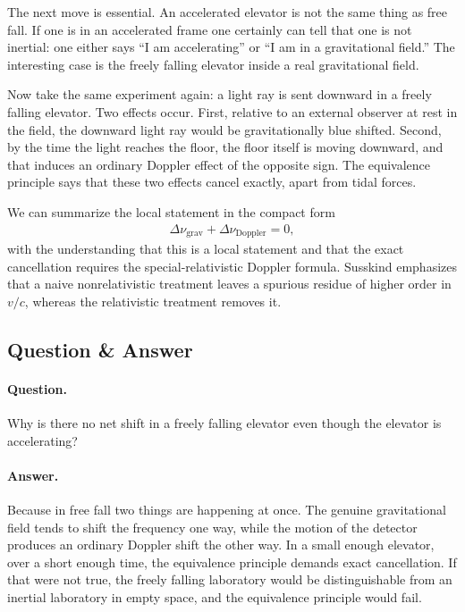 The next move is essential. An accelerated elevator is not the same thing as free fall. If one is in an accelerated frame one certainly can tell that one is not inertial: one either says ``I am accelerating'' or ``I am in a gravitational field.'' The interesting case is the freely falling elevator inside a real gravitational field.

Now take the same experiment again: a light ray is sent downward in a freely falling elevator. Two effects occur. First, relative to an external observer at rest in the field, the downward light ray would be gravitationally blue shifted. Second, by the time the light reaches the floor, the floor itself is moving downward, and that induces an ordinary Doppler effect of the opposite sign. The equivalence principle says that these two effects cancel exactly, apart from tidal forces.

We can summarize the local statement in the compact form
\begin{align}
\Delta \nu_{\text{grav}}+\Delta \nu_{\text{Doppler}}=0,
\end{align}
with the understanding that this is a local statement and that the exact cancellation requires the special-relativistic Doppler formula. Susskind emphasizes that a naive nonrelativistic treatment leaves a spurious residue of higher order in \(v/c\), whereas the relativistic treatment removes it.

\subsection{Question \& Answer}

\paragraph{Question.} Why is there no net shift in a freely falling elevator even though the elevator is accelerating?

\paragraph{Answer.} Because in free fall two things are happening at once. The genuine gravitational field tends to shift the frequency one way, while the motion of the detector produces an ordinary Doppler shift the other way. In a small enough elevator, over a short enough time, the equivalence principle demands exact cancellation. If that were not true, the freely falling laboratory would be distinguishable from an inertial laboratory in empty space, and the equivalence principle would fail.

